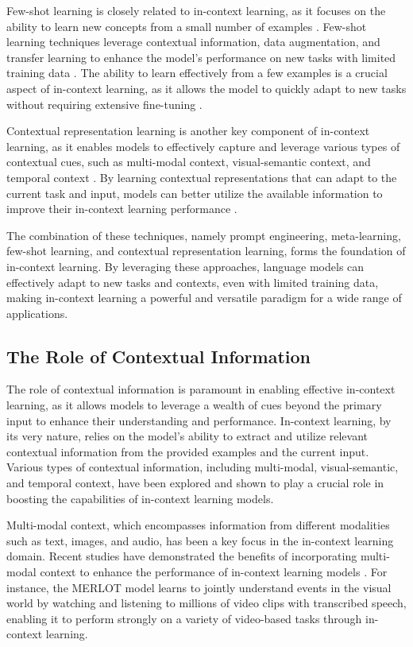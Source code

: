 \documentclass[11pt]{article}
\begin{document}
Few-shot learning is closely related to in-context learning, as it focuses on the ability to learn new concepts from a small number of examples \cite{ref29,ref30}. Few-shot learning techniques leverage contextual information, data augmentation, and transfer learning to enhance the model's performance on new tasks with limited training data \cite{ref31}. The ability to learn effectively from a few examples is a crucial aspect of in-context learning, as it allows the model to quickly adapt to new tasks without requiring extensive fine-tuning \cite{ref32}.

Contextual representation learning is another key component of in-context learning, as it enables models to effectively capture and leverage various types of contextual cues, such as multi-modal context, visual-semantic context, and temporal context \cite{ref33,ref34}. By learning contextual representations that can adapt to the current task and input, models can better utilize the available information to improve their in-context learning performance \cite{ref35}.

The combination of these techniques, namely prompt engineering, meta-learning, few-shot learning, and contextual representation learning, forms the foundation of in-context learning. By leveraging these approaches, language models can effectively adapt to new tasks and contexts, even with limited training data, making in-context learning a powerful and versatile paradigm for a wide range of applications.

\subsection{The Role of Contextual Information}

The role of contextual information is paramount in enabling effective in-context learning, as it allows models to leverage a wealth of cues beyond the primary input to enhance their understanding and performance. In-context learning, by its very nature, relies on the model's ability to extract and utilize relevant contextual information from the provided examples and the current input. Various types of contextual information, including multi-modal, visual-semantic, and temporal context, have been explored and shown to play a crucial role in boosting the capabilities of in-context learning models.

Multi-modal context, which encompasses information from different modalities such as text, images, and audio, has been a key focus in the in-context learning domain. Recent studies have demonstrated the benefits of incorporating multi-modal context to enhance the performance of in-context learning models \cite{ref36}. For instance, the MERLOT model \cite{ref36} learns to jointly understand events in the visual world by watching and listening to millions of video clips with transcribed speech, enabling it to perform strongly on a variety of video-based tasks through in-context learning.
\end{document}
